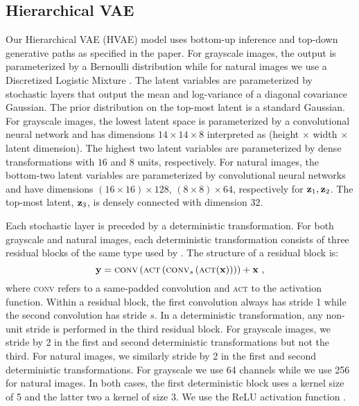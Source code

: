 {\subsection{Hierarchical VAE}
Our Hierarchical VAE (HVAE) model uses bottom-up inference and top-down generative paths as specified in the paper.
For grayscale images, the output is parameterized by a Bernoulli distribution while for natural images we use a Discretized Logistic Mixture \parencite{salimans_pixelcnn_2017}.
The latent variables are parameterized by stochastic layers that output the mean and log-variance of a diagonal covariance Gaussian. The prior distribution on the top-most latent is a standard Gaussian.
For grayscale images, the lowest latent space is parameterized by a convolutional neural network and has dimensions $14\times14\times8$ interpreted as (height $\times$ width $\times$ latent dimension). The highest two latent variables are parameterized by dense transformations with $16$ and $8$ units, respectively.
For natural images, the bottom-two latent variables are parameterized by convolutional neural networks and have dimensions $(16\times16)\times128$, $(8\times8)\times64$, respectively for ${\mathbf{z}}_1, {\mathbf{z}}_2$. The top-most latent, ${\mathbf{z}}_3$, is densely connected with dimension $32$.

Each stochastic layer is preceded by a deterministic transformation.
For both grayscale and natural images, each deterministic transformation consists of three residual blocks of the same type used by \textcite{maaloe_biva_2019}. The structure of a residual block is:
\begin{equation}
    {\mathbf{y}} = \textsc{conv}\left( \textsc{act} \left( \textsc{conv}_s \left( \textsc{act}({\mathbf{x}}) \right) \right) \right) + {\mathbf{x}} \ ,
\end{equation}
where \textsc{conv} refers to a same-padded convolution and \textsc{act} to the activation function. Within a residual block, the first convolution always has stride 1 while the second convolution has stride $s$. In a deterministic transformation, any non-unit stride is performed in the third residual block. For grayscale images, we stride by 2 in the first and second deterministic transformations but not the third. For natural images, we similarly stride by 2 in the first and second deterministic transformations. For grayscale we use 64 channels while we use 256 for natural images.
In both cases, the first deterministic block uses a kernel size of 5 and the latter two a kernel of size 3. We use the ReLU activation function \parencite{fukushima_neocognitron_1980, nair_rectified_2010}.

}
